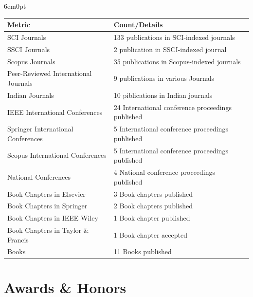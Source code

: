 \documentclass[11pt,a4paper]{moderncv}
\begin{document}
\begin{adjustwidth}{6em}{0pt}
\begin{center}
\begin{tabular}{p{7cm}p{9cm}}
	
	\hline
	\textbf{Metric} & \textbf{Count/Details} \\
	\hline
	SCI Journals& 133 publications in SCI-indexed journals \\
	SSCI Journals& 2 publication in SSCI-indexed journal \\
	Scopus Journals& 35 publications in Scopus-indexed journals \\
	Peer-Reviewed International Journals & 9 publications in various Journals \\
	Indian Journals & 10 piblications in Indian journals \\
	IEEE International Conferences & 24 International conference proceedings published \\
	Springer International Conferences  & 5 International conference proceedings published \\
	Scopus International Conferences  & 5 International conference proceedings published \\
	National Conferences  & 4 National conference proceedings published \\
	Book Chapters in Elsevier & 3 Book chapters published \\
	Book Chapters in Springer & 2 Book chapters published \\
	Book Chapters in IEEE Wiley & 1 Book chapter published \\
	Book Chapters in Taylor \& Francis & 1 Book chapter accepted \\
	Books & 11 Books published \\
	\hline
\end{tabular}
\end{center}
\end{adjustwidth}



\section{\textbf{Awards \& Honors}}
\end{document}
